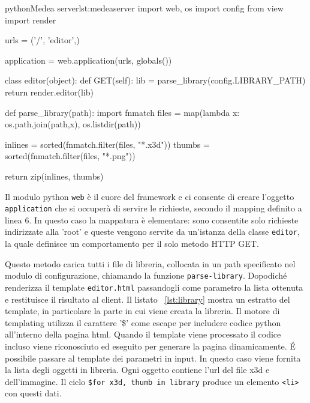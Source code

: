 \begin{mylisting}{python}{Medea server}{lst:medeaserver}
import web, os
import config
from view import render

urls = ('/', 'editor',)

application = web.application(urls, globals())

class editor(object):
    def GET(self):
        lib = parse_library(config.LIBRARY_PATH)
        return render.editor(lib)

def parse_library(path):
    import fnmatch
    files = map(lambda x: os.path.join(path,x), os.listdir(path)) 
    
    inlines = sorted(fnmatch.filter(files, "*.x3d"))
    thumbs = sorted(fnmatch.filter(files, "*.png"))

    return zip(inlines, thumbs)
\end{mylisting}

Il modulo python \texttt{web} è il cuore del framework e ci consente di creare l'oggetto \texttt{application} che si occuperà di servire le richieste, secondo il mapping definito a linea 6. In questo caso la mappatura è elementare: sono consentite solo richieste indirizzate alla 'root' e queste vengono servite da un'istanza della classe \texttt{editor}, la quale definisce un comportamento per il solo metodo HTTP GET.

Questo metodo carica tutti i file di libreria, collocata in un path specificato nel modulo di configurazione, chiamando la funzione \texttt{parse-library}. Dopodich\'{e} renderizza il template \texttt{editor.html} passandogli come parametro la lista ottenuta e restituisce il risultato al client. Il listato ~\ref{lst:library} mostra un estratto del template, in particolare la parte in cui viene creata la libreria. Il motore di templating utilizza il carattere '\$' come escape per includere codice python all'interno della pagina html. Quando il template viene processato il codice incluso viene riconosciuto ed eseguito per generare la pagina dinamicamente. \'{E} possibile passare al template dei parametri in input. In questo caso viene fornita la lista degli oggetti in libreria. Ogni oggetto contiene l'url del file x3d e dell'immagine. Il ciclo \texttt{\$for x3d, thumb in library} produce un elemento \texttt{<li>} con questi dati.



